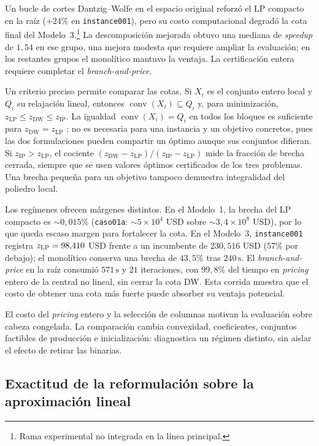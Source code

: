 Un bucle de cortes Dantzig--Wolfe en el espacio original reforzó el LP compacto en la raíz ($+24\%$ en \texttt{instance001}), pero su costo computacional degradó la cota final del Modelo~3.\footnote{Rama experimental no integrada en la línea principal.} La descomposición mejorada obtuvo una mediana de \emph{speedup} de $1{,}54$ en ese grupo, una mejora modesta que requiere ampliar la evaluación; en los restantes grupos el monolítico mantuvo la ventaja. La certificación entera requiere completar el \emph{branch-and-price}.

Un criterio preciso permite comparar las cotas. Si $X_i$ es el conjunto entero local y
$Q_i$ su relajación lineal, entonces $\operatorname{conv}(X_i)\subseteq Q_i$ y, para
minimización, $z_{\mathrm{LP}}\le z_{\mathrm{DW}}\le z_{\mathrm{IP}}$.
La igualdad $\operatorname{conv}(X_i)=Q_i$ en todos los bloques es suficiente para
$z_{\mathrm{DW}}=z_{\mathrm{LP}}$ \cite{DesrosiersLubbecke2005}; no es necesaria para
una instancia y un objetivo concretos, pues las dos formulaciones pueden compartir un
óptimo aunque sus conjuntos difieran. Si $z_{\mathrm{IP}}>z_{\mathrm{LP}}$, el cociente
$(z_{\mathrm{DW}}-z_{\mathrm{LP}})/(z_{\mathrm{IP}}-z_{\mathrm{LP}})$ mide la fracción
de brecha cerrada, siempre que se usen valores óptimos certificados de los tres problemas.
Una brecha pequeña para un objetivo tampoco demuestra integralidad del poliedro local.

Los regímenes ofrecen márgenes distintos. En el Modelo~1, la brecha del LP compacto es $\sim0{,}015\%$ (\texttt{caso01a}: $\sim5\times10^4$ USD sobre $\sim3{,}4\times10^8$ USD), por lo que queda escaso margen para fortalecer la cota. En el Modelo~3, \texttt{instance001} registra $z_{\rm LP}=98{,}410$ USD frente a un incumbente de $230{,}516$ USD ($57\%$ por debajo); el monolítico conserva una brecha de $43{,}5\%$ tras $240\,\mathrm{s}$. El \emph{branch-and-price} en la raíz consumió $571\,\mathrm{s}$ y $21$ iteraciones, con $99{,}8\%$ del tiempo en \emph{pricing} entero de la central no lineal, sin cerrar la cota DW. Esta corrida muestra que el costo de obtener una cota más fuerte puede absorber su ventaja potencial.

El costo del \emph{pricing} entero y la selección de columnas motivan la evaluación sobre cabeza congelada. La comparación cambia convexidad, coeficientes, conjuntos factibles de producción e inicialización: diagnostica un régimen distinto, sin aislar el efecto de retirar las binarias.

\subsection{Exactitud de la reformulación sobre la aproximación lineal}
\label{subsec:dw_lp_disuelve}

